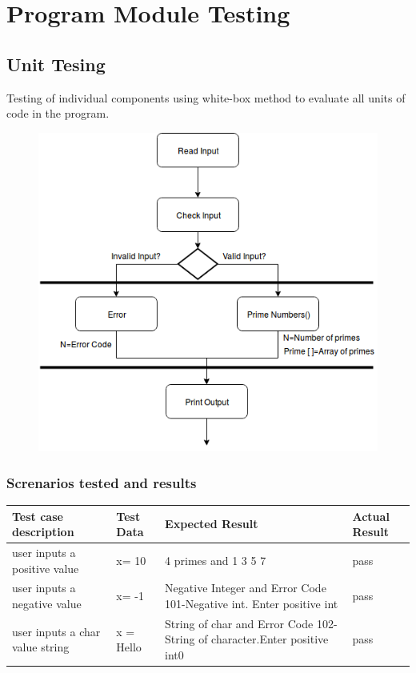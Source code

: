 \documentclass[11 pt]{article}
\begin{document}
\section{Program Module Testing}
\subsection{Unit Tesing}
Testing of individual components using white-box method to evaluate all units of code in the program.\\
\newpage
\begin{figure}[h]
    \centering
    
    \includegraphics[width=\linewidth]{Integration Testing.png}
    \end{figure}


\subsubsection{Screnarios tested and results}

\begin{tabular}{|p{4cm}|p{3cm}|p{4cm}|p{3cm}|}
\hline
\textbf{Test case description} &\textbf{Test Data} & \textbf{Expected Result} & \textbf{Actual Result}\\
\hline
 user inputs a positive value & x= 10 & 4 primes and 1 3 5 7 & pass\\
 \hline
user inputs a negative value  & x= -1 &  Negative Integer and  Error Code 101-Negative 	int. Enter positive int & pass \\
 \hline
user inputs a char value string & x = Hello &String of char and Error Code 102-String of     character.Enter positive int0
 & pass \\
 \hline
 \end{tabular}
\end{document}
